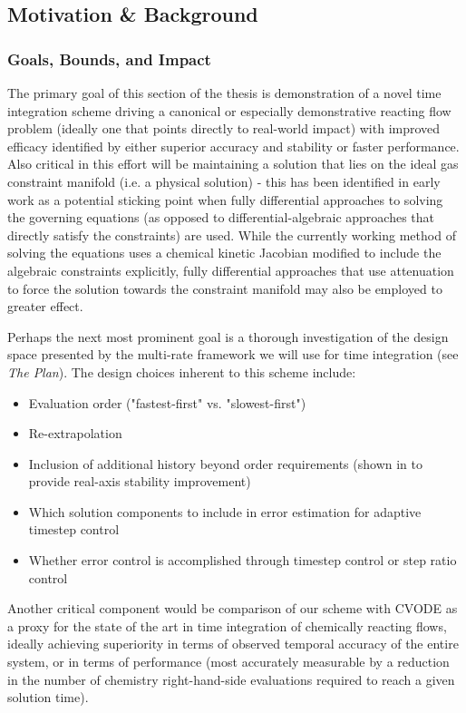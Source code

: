 \subsection{Motivation \& Background}

\subsubsection{Goals, Bounds, and Impact}

The primary goal of this section of the thesis is demonstration of a novel
time integration scheme driving a canonical or especially demonstrative
reacting flow problem (ideally one that points directly to real-world impact)
with improved efficacy identified by either superior accuracy and stability or
faster performance. Also critical in this effort will be maintaining a solution
that lies on the ideal gas constraint manifold (i.e. a physical solution) - this
has been identified in early work as a potential sticking point when fully
differential approaches to solving the governing equations (as opposed to
differential-algebraic approaches that directly satisfy the constraints) are used.
While the currently working method of solving the equations uses a chemical
kinetic Jacobian modified to include the algebraic constraints explicitly, fully
differential approaches that use attenuation to force the solution towards the
constraint manifold may also be employed to greater effect.

Perhaps the next most prominent goal is a thorough investigation of
the design space presented by the multi-rate framework we will use for time
integration (see \emph{The Plan}). The design choices inherent to this
scheme include:
\begin{itemize}
\item{Evaluation order ("fastest-first" vs. "slowest-first")}
\item{Re-extrapolation}
\item{Inclusion of additional history beyond order requirements (shown in \cite{mikida2019multi} to provide real-axis stability improvement)}
\item{Which solution components to include in error estimation for adaptive timestep
      control}
\item{Whether error control is accomplished through timestep control or step ratio control}
\end{itemize}
Another critical component would be comparison of our scheme with CVODE as
a proxy for the state of the art in time integration of chemically reacting
flows, ideally achieving superiority in terms of observed temporal accuracy
of the entire system, or in terms of performance (most accurately measurable
by a reduction in the number of chemistry right-hand-side evaluations required
to reach a given solution time).

